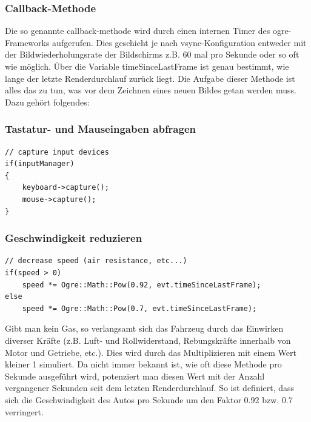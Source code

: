 \subsubsection{Callback-Methode}

Die so genannte \gls{callback-methode} wird durch einen internen Timer des \gls{ogre}-Frameworks aufgerufen. Dies geschieht je nach \gls{vsync}-Konfiguration entweder mit der Bildwiederholungsrate der Bildschirms z.B. 60 mal pro Sekunde oder so oft wie möglich. Über die Variable timeSinceLastFrame ist genau bestimmt, wie lange der letzte Renderdurchlauf zurück liegt. Die Aufgabe dieser Methode ist alles das zu tun, was vor dem Zeichnen eines neuen Bildes getan werden muss. Dazu gehört folgendes:

\subsubsection*{Tastatur- und Mauseingaben abfragen}
\begin{lstlisting}[caption={Abfragen der Eingabegeräte},label={abfragen_eingabe_geraete}]
// capture input devices
if(inputManager)
{
	keyboard->capture();
	mouse->capture();
}
\end{lstlisting}

\subsubsection*{Geschwindigkeit reduzieren}
\begin{lstlisting}[caption={Geschwindigkeit reduzieren},label={geschwindigkeit_reduzieren}]
// decrease speed (air resistance, etc...)
if(speed > 0)
	speed *= Ogre::Math::Pow(0.92, evt.timeSinceLastFrame);
else
	speed *= Ogre::Math::Pow(0.7, evt.timeSinceLastFrame);
\end{lstlisting}
Gibt man kein Gas, so verlangsamt sich das Fahrzeug durch das Einwirken diverser Kräfte (z.B. Luft- und Rollwiderstand, Rebungskräfte innerhalb von Motor und Getriebe, etc.). Dies wird durch das Multiplizieren mit einem Wert kleiner 1 simuliert. Da nicht immer bekannt ist, wie oft diese Methode pro Sekunde ausgeführt wird, potenziert man diesen Wert mit der Anzahl vergangener Sekunden seit dem letzten Renderdurchlauf. So ist definiert, dass sich die Geschwindigkeit des Autos pro Sekunde um den Faktor 0.92 bzw. 0.7 verringert.

